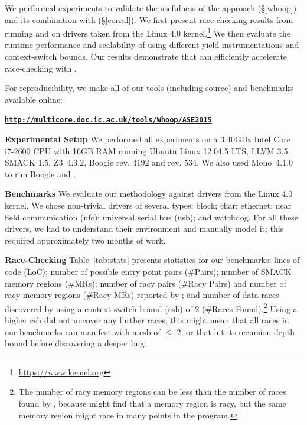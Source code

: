We performed experiments to validate the usefulness of the \whoop approach (\S\ref{whoop}) and its combination with \corral (\S\ref{corral}). We first present race-checking results from running \whoop and \corral on \sizeOfBenchmarks drivers taken from the Linux 4.0 kernel.\footnote{\url{https://www.kernel.org}} We then evaluate the runtime performance and scalability of \corral using different yield instrumentations and context-switch bounds. Our results demonstrate that \whoop can efficiently accelerate race-checking with \corral.

For reproducibility, we make all of our tools (including source) and benchmarks available online:

\begin{scriptsize}
\textbf{\texttt{\url{http://multicore.doc.ic.ac.uk/tools/Whoop/ASE2015}}}
\end{scriptsize}

\noindent\textbf{Experimental Setup }
%
We performed all experiments on a 3.40GHz Intel Core i7-2600 CPU with 16GB RAM running Ubuntu Linux 12.04.5 LTS, LLVM 3.5, SMACK 1.5, Z3~4.3.2, Boogie rev. 4192 and \corral rev. 534. We also used Mono~4.1.0 to run Boogie and \corral.

\noindent\textbf{Benchmarks }
%
We evaluate our methodology against \sizeOfBenchmarks drivers from the Linux 4.0 kernel. We chose non-trivial drivers of several types: block; char; ethernet; near field communication (nfc); universal serial bus (usb); and watchdog. For all these drivers, we had to understand their environment and manually model it; this required approximately two months of work.

\noindent\textbf{Race-Checking }
%
Table~\ref{tab:stats} presents statistics for our benchmarks: lines of code (LoC); number of possible entry point pairs (\#Pairs); number of SMACK memory regions (\#MRs); number of racy pairs (\#Racy Pairs) and number of racy memory regions (\#Racy MRs) reported by \whoop; and number of data races discovered by \corral using a context-switch bound (csb) of 2 (\#Races Found).\footnote{The number of racy memory regions can be less than the number of races found by \corral, because \whoop might find that a memory region is racy, but the same memory region might race in many points in the program.} Using a higher csb did not uncover any further races; this might mean that all races in our benchmarks can manifest with a csb of $\leq$ 2, or that \corral hit its recursion depth bound before discovering a deeper bug.

